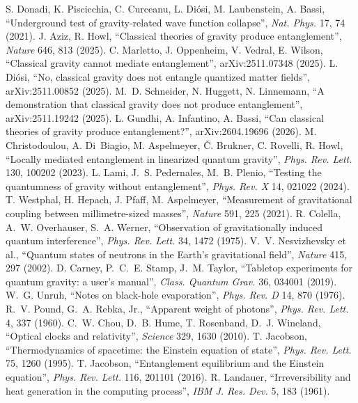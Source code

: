  S. Donadi, K. Piscicchia, C. Curceanu, L. Di\'osi, M. Laubenstein, A. Bassi, ``Underground test of gravity-related wave
function collapse'', \emph{Nat. Phys.} 17, 74 (2021).
 J. Aziz, R. Howl, ``Classical theories of gravity produce entanglement'', \emph{Nature} 646, 813 (2025).
 C. Marletto, J. Oppenheim, V. Vedral, E. Wilson, ``Classical gravity cannot mediate entanglement'', arXiv:2511.07348
(2025).
 L. Di\'osi, ``No, classical gravity does not entangle quantized matter fields'', arXiv:2511.00852 (2025).
 M.~D. Schneider, N. Huggett, N. Linnemann, ``A demonstration that classical gravity does not produce entanglement'',
arXiv:2511.19242 (2025).
 L. Gundhi, A. Infantino, A. Bassi, ``Can classical theories of gravity produce entanglement?'', arXiv:2604.19696 (2026).
 M. Christodoulou, A. Di~Biagio, M. Aspelmeyer, \v{C}. Brukner, C. Rovelli, R. Howl, ``Locally mediated
entanglement in linearized quantum gravity'', \emph{Phys. Rev. Lett.} 130, 100202 (2023).
 L. Lami, J.~S. Pedernales, M.~B. Plenio, ``Testing the quantumness of gravity without entanglement'', \emph{Phys. Rev. X} 14,
021022 (2024).
 T. Westphal, H. Hepach, J. Pfaff, M. Aspelmeyer, ``Measurement of gravitational coupling between millimetre-sized
masses'', \emph{Nature} 591, 225 (2021).
 R. Colella, A.~W. Overhauser, S.~A. Werner, ``Observation of gravitationally induced quantum interference'', \emph{Phys. Rev.
Lett.} 34, 1472 (1975).
 V.~V. Nesvizhevsky et al., ``Quantum states of neutrons in the Earth's gravitational field'', \emph{Nature} 415,
297 (2002).
 D. Carney, P.~C.~E. Stamp, J.~M. Taylor, ``Tabletop experiments for quantum gravity: a user's manual'', \emph{Class. Quantum
Grav.} 36, 034001 (2019).
 W.~G. Unruh, ``Notes on black-hole evaporation'', \emph{Phys. Rev. D} 14, 870 (1976).
 R.~V. Pound, G.~A. Rebka, Jr., ``Apparent weight of photons'', \emph{Phys. Rev. Lett.} 4, 337 (1960).
 C.~W. Chou, D.~B. Hume, T. Rosenband, D.~J. Wineland, ``Optical clocks and relativity'', \emph{Science} 329, 1630 (2010).
 T. Jacobson, ``Thermodynamics of spacetime: the Einstein equation of state'', \emph{Phys. Rev. Lett.} 75, 1260 (1995).
 T. Jacobson, ``Entanglement equilibrium and the Einstein equation'', \emph{Phys. Rev. Lett.} 116, 201101 (2016).
 R. Landauer, ``Irreversibility and heat generation in the computing process'', \emph{IBM J. Res. Dev.} 5, 183 (1961).
